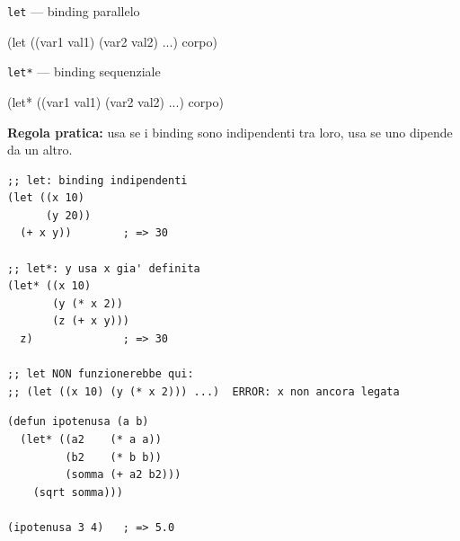 \begin{concetto}{\texttt{let} --- binding parallelo}

\begin{sintassi}
(let ((var1 val1) (var2 val2) ...) corpo)
\end{sintassi}

\end{concetto}

\begin{concetto}{\texttt{let*} --- binding sequenziale}

\begin{sintassi}
(let* ((var1 val1) (var2 val2) ...) corpo)
\end{sintassi}

\end{concetto}

\begin{confronto}
\textbf{Regola pratica:}
usa  se i binding sono indipendenti tra loro,
usa  se uno dipende da un altro.
\end{confronto}

\begin{esempio}
\begin{lstlisting}
;; let: binding indipendenti
(let ((x 10)
      (y 20))
  (+ x y))        ; => 30

;; let*: y usa x gia' definita
(let* ((x 10)
       (y (* x 2))
       (z (+ x y)))
  z)              ; => 30

;; let NON funzionerebbe qui:
;; (let ((x 10) (y (* x 2))) ...)  ERROR: x non ancora legata
\end{lstlisting}
\end{esempio}

\begin{esempio}
\begin{lstlisting}
(defun ipotenusa (a b)
  (let* ((a2    (* a a))
         (b2    (* b b))
         (somma (+ a2 b2)))
    (sqrt somma)))

(ipotenusa 3 4)   ; => 5.0
\end{lstlisting}
\end{esempio}

